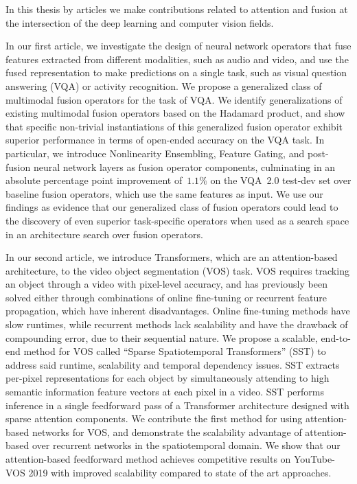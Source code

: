 In this thesis by articles we make contributions related to attention and
fusion at the intersection of the deep learning and computer vision fields.

In our first article, we investigate the design of neural network operators
that fuse features extracted from different modalities, such as audio and
video, and use the fused representation to make predictions on a single task,
such as visual question answering (VQA) or activity recognition.
We propose a generalized class of multimodal fusion operators for the task of
VQA.
We identify generalizations of existing multimodal fusion operators based on
the Hadamard product, and show that specific non-trivial instantiations of this
generalized fusion operator exhibit superior performance in terms of open-ended
accuracy on the VQA task.
In particular, we introduce Nonlinearity Ensembling, Feature Gating, and
post-fusion neural network layers as fusion operator components, culminating in
an absolute percentage point improvement of~$1.1\%$ on the VQA~2.0 test-dev set
over baseline fusion operators, which use the same features as input.
We use our findings as evidence that our generalized class of fusion operators
could lead to the discovery of even superior task-specific operators when used
as a search space in an architecture search over fusion operators.

In our second article, we introduce Transformers, which are an attention-based
architecture, to the video object segmentation (VOS) task.
VOS requires tracking an object through a video
with pixel-level accuracy, and has previously been solved either through
combinations of online fine-tuning or recurrent feature propagation, which have
inherent disadvantages.
Online fine-tuning methods have slow runtimes, while recurrent methods lack
scalability and have the drawback of compounding error, due to their sequential
nature.
We propose a scalable, end-to-end method for VOS called
``Sparse Spatiotemporal Transformers'' (SST) to address said runtime,
scalability and temporal dependency issues.
SST extracts per-pixel representations for each object by simultaneously
attending to high semantic information feature vectors at each pixel in a
video.
SST performs inference in a single feedforward pass of a Transformer
architecture designed with sparse attention components.
We contribute the first method for using attention-based networks for VOS, and
demonstrate the scalability advantage of attention-based over recurrent
networks in the spatiotemporal domain.
We show that our attention-based feedforward method achieves competitive
results on YouTube-VOS 2019 with improved scalability compared to state of the
art approaches.
